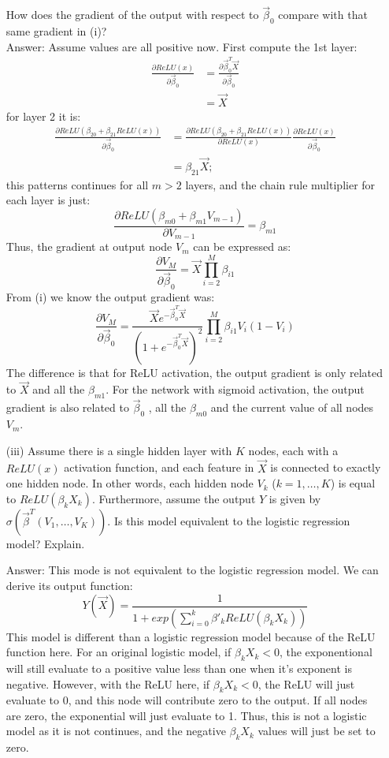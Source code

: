 \documentclass[11pt]{article}
\begin{document}
\begin{itemize}
How does the gradient of the output with respect to $\vec{\beta}_0$ compare with that same gradient in (i)?\\
Answer: Assume values are all positive now. First compute the 1st layer:
\begin{align*}
\frac{\partial ReLU(x)}{\partial \vec{\beta}_0 }&=\frac{\partial \vec{\beta}_0^T \vec{X}}{\partial \vec{\beta}_0 }\\
&= \vec{X}
\end{align*}
for layer 2 it is:
\begin{align*}
\frac{\partial ReLU(\beta_{20} + \beta_{21} ReLU(x))}{\partial \vec{\beta}_0 } &= \frac{\partial ReLU(\beta_{20} + \beta_{21} ReLU(x))}{\partial ReLU(x)}\frac{\partial ReLU(x)}{\partial \vec{\beta}_0 }\\
& = \beta_{21}\vec{X};
\end{align*}
this patterns continues for all $m>2$ layers, and the chain rule multiplier for each layer is just:
$$\frac{\partial ReLU(\beta_{m0} + \beta_{m1} V_{m-1})}{\partial V_{m-1} }=\beta_{m1}$$
Thus, the gradient at output node $V_m$ can be expressed as:
$$\frac{\partial V_M}{\partial \vec{\beta}_0 }=\vec{X}\prod_{i = 2}^{M}\beta_{i1}$$
From (i) we know the output gradient was:
$$\frac{\partial V_M}{\partial \vec{\beta}_0 }=\frac{\vec{X}e^{-\vec{\beta}_0^T \vec{X}}}{(1 + e^{-\vec{\beta}_0^T \vec{X}})^{2}}\prod_{i = 2}^{M}\beta_{i1}V_{i}(1-V_{i})$$
The difference is that for ReLU activation, the output gradient is only related to $\vec X$ and all the $\beta_{m1}$. For the network with sigmoid activation, the output gradient is also related to $\vec{\beta}_0$ , all the $\beta_{m0}$ and the current value of all nodes $V_m$.

\item[(iii)] Assume there is a single hidden layer with $K$ nodes, each with a $ReLU(x)$ activation function, and each feature in $\vec{X}$ is connected to exactly one hidden node.  In other words, each hidden node $V_k$ ($k = 1, \ldots, K$) is equal to $ReLU(\beta_k X_k)$.  Furthermore, assume the output $Y$ is given by $\sigma(\vec{\beta}^T (V_1, \ldots, V_K))$.  Is this model equivalent to the logistic regression model?  Explain.

Answer: This mode is not equivalent to the logistic regression model. We can derive its output function:
$$Y(\vec X)=\frac{1}{1+exp(\sum_{i=0}^{k}\beta'_kReLU(\beta_k X_k))}$$
This model is different than a logistic regression model because of the ReLU function here. For an original logistic model, if $\beta_k X_k <0$, the exponentional will still evaluate to a positive value less than one when it's exponent is negative. However, with the ReLU here, if $\beta_k X_k <0$, the ReLU will just evaluate to 0, and this node will contribute zero to the output. If all nodes are zero, the exponential will just evaluate to 1. Thus, this is not a logistic model as it is not continues, and the negative $\beta_k X_k$ values will just be set to zero.


\end{itemize}
\end{document}
